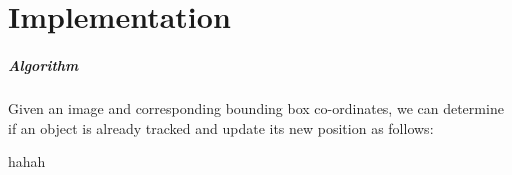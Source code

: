\chapter{Implementation}

\paragraph{Algorithm} Given an image and corresponding bounding box co-ordinates, we can determine if an object is already tracked and update its new position as follows:

\begin{algorithm}[ht] 
	\For hahah
\end{algorithm}
